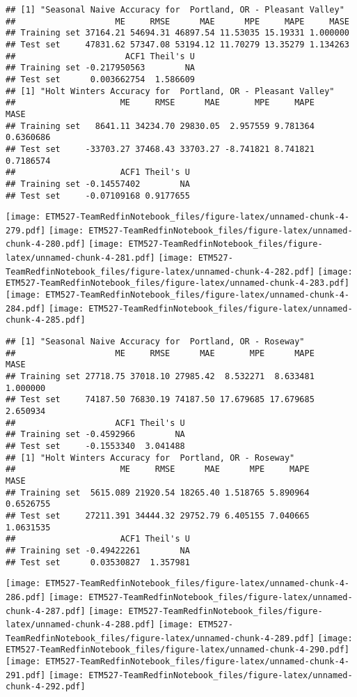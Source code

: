 \documentclass[]{article}
\begin{document}
\begin{verbatim}
## [1] "Seasonal Naive Accuracy for  Portland, OR - Pleasant Valley"
##                    ME     RMSE      MAE      MPE     MAPE     MASE
## Training set 37164.21 54694.31 46897.54 11.53035 15.19331 1.000000
## Test set     47831.62 57347.08 53194.12 11.70279 13.35279 1.134263
##                      ACF1 Theil's U
## Training set -0.217950563        NA
## Test set      0.003662754  1.586609
## [1] "Holt Winters Accuracy for  Portland, OR - Pleasant Valley"
##                     ME     RMSE      MAE       MPE     MAPE      MASE
## Training set   8641.11 34234.70 29830.05  2.957559 9.781364 0.6360686
## Test set     -33703.27 37468.43 33703.27 -8.741821 8.741821 0.7186574
##                     ACF1 Theil's U
## Training set -0.14557402        NA
## Test set     -0.07109168 0.9177655
\end{verbatim}

\texttt{[image: ETM527-TeamRedfinNotebook\_files/figure-latex/unnamed-chunk-4-279.pdf]}
\texttt{[image: ETM527-TeamRedfinNotebook\_files/figure-latex/unnamed-chunk-4-280.pdf]}
\texttt{[image: ETM527-TeamRedfinNotebook\_files/figure-latex/unnamed-chunk-4-281.pdf]}
\texttt{[image: ETM527-TeamRedfinNotebook\_files/figure-latex/unnamed-chunk-4-282.pdf]}
\texttt{[image: ETM527-TeamRedfinNotebook\_files/figure-latex/unnamed-chunk-4-283.pdf]}
\texttt{[image: ETM527-TeamRedfinNotebook\_files/figure-latex/unnamed-chunk-4-284.pdf]}
\texttt{[image: ETM527-TeamRedfinNotebook\_files/figure-latex/unnamed-chunk-4-285.pdf]}

\begin{verbatim}
## [1] "Seasonal Naive Accuracy for  Portland, OR - Roseway"
##                    ME     RMSE      MAE       MPE      MAPE     MASE
## Training set 27718.75 37018.10 27985.42  8.532271  8.633481 1.000000
## Test set     74187.50 76830.19 74187.50 17.679685 17.679685 2.650934
##                    ACF1 Theil's U
## Training set -0.4592966        NA
## Test set     -0.1553340  3.041488
## [1] "Holt Winters Accuracy for  Portland, OR - Roseway"
##                     ME     RMSE      MAE      MPE     MAPE      MASE
## Training set  5615.089 21920.54 18265.40 1.518765 5.890964 0.6526755
## Test set     27211.391 34444.32 29752.79 6.405155 7.040665 1.0631535
##                     ACF1 Theil's U
## Training set -0.49422261        NA
## Test set      0.03530827  1.357981
\end{verbatim}

\texttt{[image: ETM527-TeamRedfinNotebook\_files/figure-latex/unnamed-chunk-4-286.pdf]}
\texttt{[image: ETM527-TeamRedfinNotebook\_files/figure-latex/unnamed-chunk-4-287.pdf]}
\texttt{[image: ETM527-TeamRedfinNotebook\_files/figure-latex/unnamed-chunk-4-288.pdf]}
\texttt{[image: ETM527-TeamRedfinNotebook\_files/figure-latex/unnamed-chunk-4-289.pdf]}
\texttt{[image: ETM527-TeamRedfinNotebook\_files/figure-latex/unnamed-chunk-4-290.pdf]}
\texttt{[image: ETM527-TeamRedfinNotebook\_files/figure-latex/unnamed-chunk-4-291.pdf]}
\texttt{[image: ETM527-TeamRedfinNotebook\_files/figure-latex/unnamed-chunk-4-292.pdf]}
\end{document}
